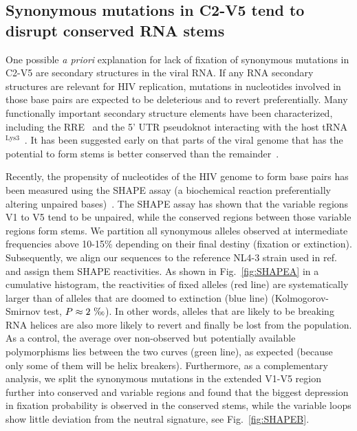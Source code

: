 \documentclass[rmp, twocolumn]{revtex4}
\newcommand{\FIG}[1]{Fig.~\ref{fig:#1}}
\begin{document}
\subsection{Synonymous mutations in C2-V5 tend to disrupt conserved RNA stems}

One possible {\it a priori} explanation for lack of fixation of synonymous
mutations in C2-V5 are  secondary structures in the viral RNA. If any RNA
secondary structures are relevant for HIV replication, mutations in nucleotides
involved in those base pairs are expected to be deleterious and to revert
preferentially. Many functionally important secondary structure elements have
been characterized, including  the RRE~\citep{fernandes_hiv-1_2012} and the 5'
UTR pseudoknot interacting with the host
tRNA$^\text{Lys3}$~\citep{barat_interaction_1991, paillart_vitro_2002}. It has
been suggested early on that parts of the viral genome that has the potential to
form stems is better conserved than the
remainder~\citep{forsdyke_reciprocal_1995}.

Recently, the propensity of nucleotides of the HIV genome to form base pairs has
been measured using the SHAPE assay (a biochemical reaction preferentially
altering unpaired bases)~\citep{watts_architecture_2009}. The SHAPE assay has
shown that the variable regions V1 to V5 tend to be unpaired, while the
conserved regions between those variable regions form stems. We partition all
synonymous alleles observed at intermediate frequencies above 10-15\% depending
on their final destiny (fixation or extinction). Subsequently, we align our
sequences to the reference NL4-3 strain used in
ref.~\citep{watts_architecture_2009} and assign them SHAPE reactivities. As
shown in \FIG{SHAPEA} in a cumulative histogram, the reactivities of fixed
alleles (red line) are systematically larger than of alleles that are doomed to
extinction (blue line) (Kolmogorov-Smirnov test, $P\approx
2~\text{\textperthousand}$). In other words, alleles that are likely to be
breaking RNA helices are also more likely to revert and finally be lost from the
population. As a control, the average over non-observed but potentially
available polymorphisms lies between the two curves (green line), as expected
(because only some of them will be helix breakers). Furthermore, as a
complementary analysis, we split the synonymous mutations in the extended V1-V5
region further into conserved and variable regions and found that the biggest
depression in fixation probability is observed in the conserved stems, while the
variable loops show little deviation from the neutral signature, see
\FIG{SHAPEB}. 
\end{document}
